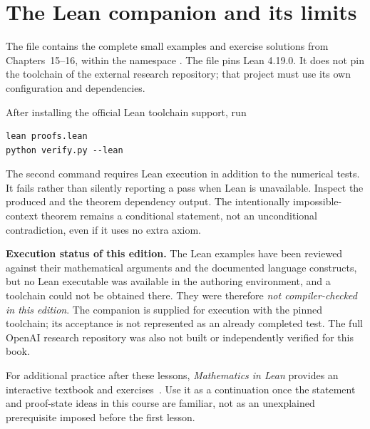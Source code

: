 \section{The Lean companion and its limits}
The file  contains the complete small examples and exercise solutions from Chapters~15--16, within the namespace . The file  pins Lean 4.19.0. It does not pin the toolchain of the external research repository; that project must use its own configuration and dependencies.

After installing the official Lean toolchain support, run
\par\noindent\begin{minipage}{\linewidth}
\begin{lstlisting}
lean proofs.lean
python verify.py --lean
\end{lstlisting}
\end{minipage}\par

The second command requires Lean execution in addition to the numerical tests. It fails rather than silently reporting a pass when Lean is unavailable. Inspect the produced  and the theorem dependency output. The intentionally impossible-context theorem remains a conditional statement, not an unconditional contradiction, even if it uses no extra axiom.

\textbf{Execution status of this edition.} The Lean examples have been reviewed against their mathematical arguments and the documented language constructs, but no Lean executable was available in the authoring environment, and a toolchain could not be obtained there. They were therefore \emph{not compiler-checked in this edition}. The companion is supplied for execution with the pinned toolchain; its acceptance is not represented as an already completed test. The full OpenAI research repository was also not built or independently verified for this book.

For additional practice after these lessons, \emph{Mathematics in Lean} provides an interactive textbook and exercises~\cite{mil}. Use it as a continuation once the statement and proof-state ideas in this course are familiar, not as an unexplained prerequisite imposed before the first lesson.
